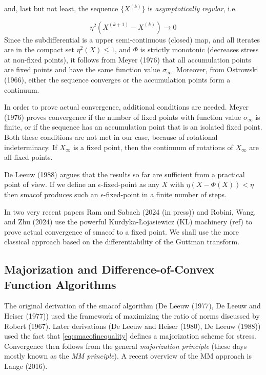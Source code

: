 \documentclass[
  12pt,
]{article}
\begin{document}
and, last but not least, the sequence \(\{X^{(k)}\}\) is \emph{asymptotically regular}, i.e.

\[
\eta^2(X^{(k+1)}-X^{(k)})\rightarrow 0
\]
Since the subdifferential is a upper semi-continuous (closed) map, and all iterates
are in the compact set \(\eta^2(X)\leq 1\), and \(\Phi\) is strictly monotonic
(decreases stress at non-fixed points), it follows from Meyer (1976) that
all accumulation points are fixed points and have the same function value \(\sigma_\infty\). Moreover, from Ostrowski (1966), either the sequence
converges or the accumulation points form a continuum.

In order to prove actual convergence, additional conditions are needed.
Meyer (1976) proves convergence if the number of fixed points with function value \(\sigma_\infty\) is finite, or if the sequence has an accumulation point that is an isolated fixed point. Both these conditions are not met in our case, because
of rotational indeterminacy. If \(X_\infty\) is a fixed point, then the
continuum of rotations of \(X_\infty\) are all fixed points.

De Leeuw (1988) argues that the results so far are sufficient from a
practical point of view. If we define an \(\epsilon\)-fixed-point as
any \(X\) with \(\eta(X-\Phi(X))<\eta\) then smacof produces such an
\(\epsilon\)-fixed-point in a finite number of steps.

In two very recent
papers Ram and Sabach (2024 (in press)) and Robini, Wang, and Zhu (2024) use the powerful Kurdyka-Łojasiewicz (KL)
machinery (ref)
to prove actual convergence of smacof to a fixed point. We shall
use the more classical approach based on the differentiability of the Guttman
transform.

\subsection{Majorization and Difference-of-Convex Function Algorithms}\label{majorization-and-difference-of-convex-function-algorithms}

The original derivation of the smacof algorithm (De Leeuw (1977), De Leeuw and Heiser (1977))
used the framework of maximizing the ratio of norms discussed by Robert (1967). Later
derivations (De Leeuw and Heiser (1980), De Leeuw (1988)) used the fact that \eqref{eq:smacofinequality} defines a majorization scheme for stress. Convergence
then follows from the general \emph{majorization principle} (these days mostly known
as the \emph{MM principle}). A recent overview of the MM approach is Lange (2016).
\end{document}
